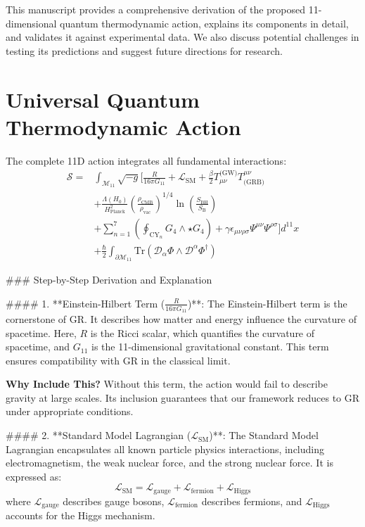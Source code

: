 \documentclass[12pt, a4paper]{article}
\begin{document}
This manuscript provides a comprehensive derivation of the proposed 11-dimensional quantum thermodynamic action, explains its components in detail, and validates it against experimental data. We also discuss potential challenges in testing its predictions and suggest future directions for research.

\section{Universal Quantum Thermodynamic Action}
The complete 11D action integrates all fundamental interactions:
\[
\boxed{
\begin{aligned}
\mathcal{S} = & \int_{\mathcal{M}_{11}} \sqrt{-g} \Bigg[ \frac{R}{16\pi G_{11}} + \mathcal{L}_{\text{SM}} + \frac{\beta}{2} T_{\mu\nu}^{\text{(GW)}} T^{\mu\nu}_{\text{(GRB)}} \\
& + \frac{\Lambda(H_0)}{H_{\text{Planck}}^2} \left( \frac{\rho_{\text{CMB}}}{\rho_{\text{vac}}} \right)^{1/4} \ln\left(\frac{S_{\text{BH}}}{S_{\text{B}}}\right) \\
& + \sum_{n=1}^7 \left( \oint_{\text{CY}_n} G_4 \wedge \star G_4 \right) + \gamma \epsilon_{\mu\nu\rho\sigma} \Psi^{\mu\nu} \Psi^{\rho\sigma} \Bigg] d^{11}x \\
& + \frac{\hbar}{2} \int_{\partial\mathcal{M}_{11}} \text{Tr}\left( \mathcal{D}_\alpha \Phi \wedge \mathcal{D}^\alpha \Phi^\dagger \right)
\end{aligned}
}
\]

### Step-by-Step Derivation and Explanation

#### 1. **Einstein-Hilbert Term ($\frac{R}{16\pi G_{11}}$)**:
The Einstein-Hilbert term is the cornerstone of GR. It describes how matter and energy influence the curvature of spacetime. Here, $R$ is the Ricci scalar, which quantifies the curvature of spacetime, and $G_{11}$ is the 11-dimensional gravitational constant. This term ensures compatibility with GR in the classical limit.

\textbf{Why Include This?} Without this term, the action would fail to describe gravity at large scales. Its inclusion guarantees that our framework reduces to GR under appropriate conditions.

#### 2. **Standard Model Lagrangian ($\mathcal{L}_{\text{SM}}$)**:
The Standard Model Lagrangian encapsulates all known particle physics interactions, including electromagnetism, the weak nuclear force, and the strong nuclear force. It is expressed as:
\[
\mathcal{L}_{\text{SM}} = \mathcal{L}_{\text{gauge}} + \mathcal{L}_{\text{fermion}} + \mathcal{L}_{\text{Higgs}}
\]
where $\mathcal{L}_{\text{gauge}}$ describes gauge bosons, $\mathcal{L}_{\text{fermion}}$ describes fermions, and $\mathcal{L}_{\text{Higgs}}$ accounts for the Higgs mechanism.
\end{document}
